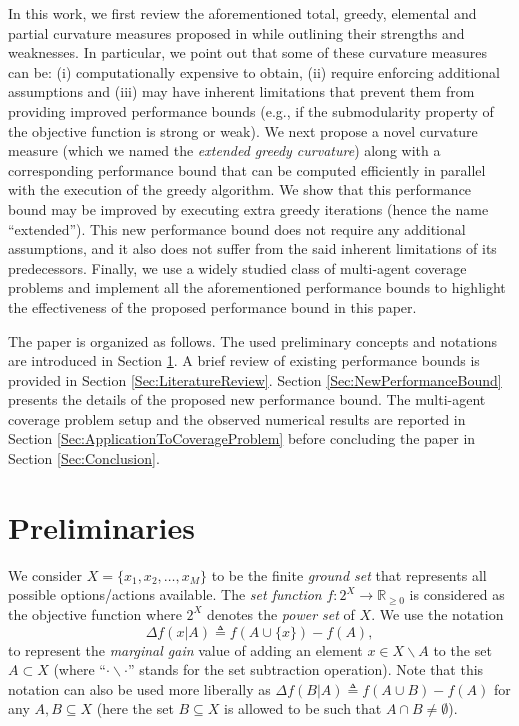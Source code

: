 \documentclass[conference]{IEEEtran}
\newcommand{\R}{\mathbb{R}}
\begin{document}
In this work, we first review the aforementioned total, greedy, elemental and partial curvature measures proposed in \cite{Conforti1984,Wang2016,Liu2018} while outlining their strengths and weaknesses. In particular, we point out that some of these curvature measures can be: (i) computationally expensive to obtain, (ii) require enforcing additional assumptions and (iii) may have inherent limitations that prevent them from providing improved performance bounds (e.g., if the submodularity property of the objective function is strong or weak). We next propose a novel curvature measure (which we named the \emph{extended greedy curvature}) along with a corresponding performance bound that can be computed efficiently in parallel with the execution of the greedy algorithm. We show that this performance bound may be improved by executing extra greedy iterations (hence the name ``extended''). This new performance bound does not require any additional assumptions, and it also does not suffer from the said inherent limitations of its predecessors. Finally, we use a widely studied class of multi-agent coverage problems \cite{Sun2019,Sun2020} and implement all the aforementioned performance bounds to highlight the effectiveness of the proposed performance bound in this paper.  







The paper is organized as follows. The used preliminary concepts and notations are introduced in Section \ref{Sec:PreliminariesAndNotation}. A brief review of existing performance bounds is provided in Section \ref{Sec:LiteratureReview}. Section \ref{Sec:NewPerformanceBound} presents the details of the proposed new performance bound. The multi-agent coverage problem setup and the observed numerical results are reported in Section \ref{Sec:ApplicationToCoverageProblem} before concluding the paper in Section \ref{Sec:Conclusion}. 




\section{Preliminaries}
\label{Sec:PreliminariesAndNotation}
We consider $X=\{x_1,x_2,\ldots,x_M\}$ to be the finite \emph{ground set} that represents all possible options/actions available. The \emph{set function} $f:2^X\rightarrow \R_{\geq0}$ is considered as the objective function where $2^X$ denotes the \emph{power set} of $X$. We use the notation 
\begin{equation}\label{Eq:MarginalGainNotation}
    \Delta f(x \vert A) \triangleq f(A\cup \{x\}) - f(A),
\end{equation}
to represent the \emph{marginal gain} value of adding an element $x \in X\backslash A$ to the set $A\subset X$ (where ``$\cdot \backslash \cdot$'' stands for the set subtraction operation). Note that this notation can also be used more liberally as 
$\Delta f(B \vert A) \triangleq f(A\cup B)-f(A)$ for any $A,B\subseteq X$ (here the set $B \subseteq X$ is allowed to be such that $A \cap B \neq \emptyset$).
\end{document}
